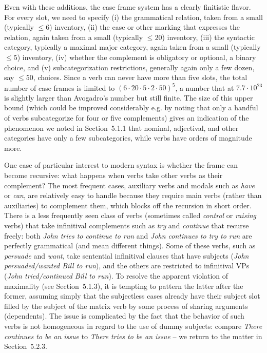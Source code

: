 Even with these additions, the case frame system has a clearly finitistic
flavor.  For every slot, we need to specify (i) the grammatical relation,
taken from a small (typically $\leq 6$) inventory, (ii) the case or other
marking that expresses the relation, again taken from a small (typically $\leq
20$) inventory, (iii) the syntactic category, typically a maximal major
category, again taken from a small (typically $\leq 5$) inventory, (iv)
whether the complement is obligatory or optional, a binary choice, and (v)
subcategorization restrictions, generally again only a few dozen, say $\leq
50$, choices. Since a verb can never have more than five slots, the total
number of case frames is limited to $(6 \cdot 20 \cdot 5 \cdot 2 \cdot 50)^5$,
a number that at $7.7 \cdot 10^{23}$ is slightly larger than Avogadro's number
but still finite. The size of this upper bound (which could be improved
considerably e.g. by noting that only a handful of verbs subcategorize for
four or five complements) gives an indication of the phenomenon we noted in
Section~5.1.1 that nominal, adjectival, and other categories have only a few
subcategories, while verbs have orders of magnitude more.

One case of particular interest to modern syntax is whether the frame can
become recursive: what happens when verbs take other verbs as their
complement?  The most frequent cases, auxiliary verbs and modals such as {\it
  have} or {\it can}, are relatively easy to handle because they require main
verbs (rather than auxiliaries) to complement them, which blocks off the
recursion in short order. There is a less frequently seen class of verbs
(sometimes called {\it control} or {\it raising} verbs) that take infinitival complements such as {\it
  try} and {\it continue} that recurse freely: both {\it John tries to
  continue to run} and {\it John continues to try to run} are perfectly
grammatical (and mean different things).  Some of these verbs, such as {\it
  persuade} and {\it want}, take sentential infinitival clauses that have
subjects ({\it John persuaded/wanted Bill to run}), and the others are
restricted to infinitival VPs ({\it *John tried/continued Bill to run}). To
resolve the apparent violation of maximality (see Section~5.1.3), it is
tempting to pattern the latter after the former, assuming simply that the
subjectless cases already have their subject slot filled by the subject of the
matrix verb by some process of sharing arguments (dependents). The issue is
complicated by the fact that the behavior of such verbs is not homogeneous in
regard to the use of dummy subjects: compare {\it There continues to be an
  issue} to {\it *There tries to be an issue} -- we return to the matter in
Section~5.2.3.

